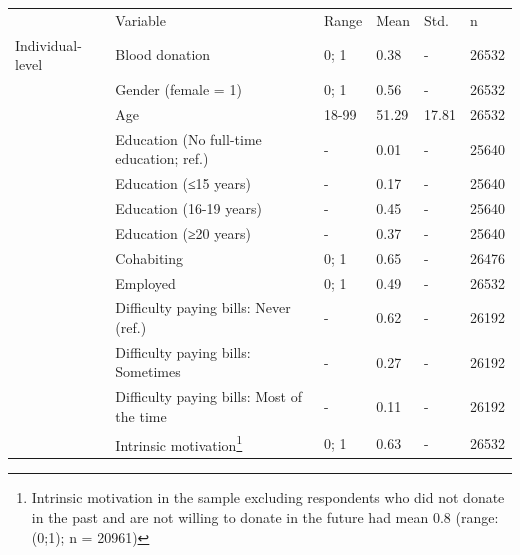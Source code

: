 \documentclass[AER]{AEA}
\begin{document}
\begin{table}[]
\begin{tabular}{l|l|l|l|l|l}
                 &                                              Variable  & Range                      & Mean                       & Std.         & n                          \\
Individual-level & Blood donation                                 & 0; 1                       & 0.38                       & -                          & 26532 \\
                 & Gender (female = 1)                            & 0; 1                       & 0.56  & -     & 26532 \\
                 & Age                                            & 18-99 & 51.29 & 17.81 & 26532 \\
                 & Education (No full-time education; ref.)       & -                          & 0.01  & -     & 25640 \\
                 & Education (≤15 years)                          & -                          & 0.17  & -     & 25640 \\
                 & Education (16-19 years)                        & -                          & 0.45  & -     & 25640 \\
                 & Education (≥20 years)                          & -                          & 0.37                       & -     & 25640 \\
                 & Cohabiting                                     & 0; 1                       & 0.65  & -     & 26476 \\
                 & Employed                                       & 0; 1                       & 0.49  & -                          & 26532 \\
                 & Difficulty paying bills: Never (ref.)          & -                          & 0.62  & -     & 26192 \\
                 & Difficulty paying bills: Sometimes             & -                          & 0.27  & -     & 26192 \\
                 & Difficulty paying bills: Most of the time      & -                          & 0.11                       & -     & 26192 \\
                 & Intrinsic motivation\footnote{Intrinsic motivation in the sample excluding respondents who did not donate in the past and are not willing to donate in the future had mean 0.8 (range: (0;1); n = 20961)}                          & 0; 1                       & 0.63  & -     & 26532 \\

\end{tabular}
\end{table}
\end{document}

